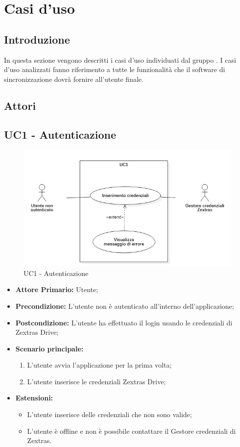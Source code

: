 \section{Casi d'uso}
\subsection{Introduzione}
In questa sezione vengono descritti i casi d'uso individuati dal gruppo \gruppo{}.
I casi d'uso analizzati fanno riferimento a tutte le funzionalità che il software di sincronizzazione dovrà fornire all'utente finale.

\subsection{Attori}


\subsection{UC1 - Autenticazione}
\begin{figure}[H]
    \centering
    \includegraphics[scale = 0.7]{components/img/UC1.png}
    \caption{UC1 - Autenticazione}
\end{figure}
\begin{itemize}
\item \textbf{Attore Primario:} Utente;
\item \textbf{Precondizione:} L'utente non è autenticato all'interno dell'applicazione;
\item \textbf{Postcondizione:} L'utente ha effettuato il login usando le credenziali di Zextras Drive;
\item \textbf{Scenario principale:}
    \begin{enumerate}
    \item L'utente avvia l'applicazione per la prima volta;
    \item L'utente inserisce le credenziali Zextras Drive;
    \end{enumerate}
\item \textbf{Estensioni:}
\begin{itemize}
\item L'utente inserisce delle credenziali che non sono valide;
\item L'utente è offline e non è possibile contattare il Gestore credenziali di Zextras.
\end{itemize}
\end{itemize}